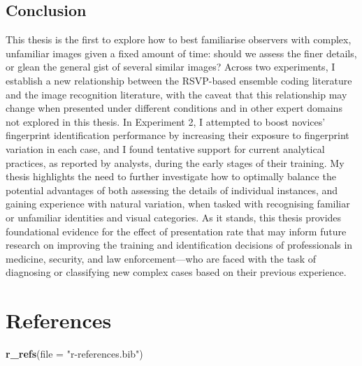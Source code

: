 \documentclass[
  english,
  man]{apa6}
\newenvironment{Shaded}{\begin{snugshade}}{\end{snugshade}}
\newcommand{\DataTypeTok}[1]{\textcolor[rgb]{0.13,0.29,0.53}{#1}}
\newcommand{\KeywordTok}[1]{\textcolor[rgb]{0.13,0.29,0.53}{\textbf{#1}}}
\newcommand{\NormalTok}[1]{#1}
\newcommand{\StringTok}[1]{\textcolor[rgb]{0.31,0.60,0.02}{#1}}
\newenvironment{cslreferences}%
  {}%
  {\par}
\begin{document}
\hypertarget{conclusion}{%
\subsection{Conclusion}\label{conclusion}}

This thesis is the first to explore how to best familiarise observers with complex, unfamiliar images given a fixed amount of time: should we assess the finer details, or glean the general gist of several similar images? Across two experiments, I establish a new relationship between the RSVP-based ensemble coding literature and the image recognition literature, with the caveat that this relationship may change when presented under different conditions and in other expert domains not explored in this thesis. In Experiment 2, I attempted to boost novices' fingerprint identification performance by increasing their exposure to fingerprint variation in each case, and I found tentative support for current analytical practices, as reported by analysts, during the early stages of their training. My thesis highlights the need to further investigate how to optimally balance the potential advantages of both assessing the details of individual instances, and gaining experience with natural variation, when tasked with recognising familiar or unfamiliar identities and visual categories. As it stands, this thesis provides foundational evidence for the effect of presentation rate that may inform future research on improving the training and identification decisions of professionals in medicine, security, and law enforcement---who are faced with the task of diagnosing or classifying new complex cases based on their previous experience.

\newpage

\hypertarget{references}{%
\section{References}\label{references}}

\begin{Shaded}
\begin{Highlighting}[]
\KeywordTok{r\_refs}\NormalTok{(}\DataTypeTok{file =} \StringTok{"r{-}references.bib"}\NormalTok{)}
\end{Highlighting}
\end{Shaded}

\begingroup
\setlength{\parindent}{-0.5in}
\setlength{\leftskip}{0.5in}

\hypertarget{refs}{}
\begin{cslreferences}
\end{cslreferences}

\endgroup
\end{document}

